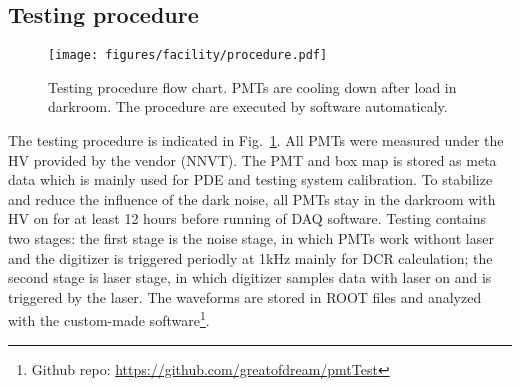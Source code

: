 \subsection{Testing procedure}
\begin{figure}
    \centering
    \texttt{[image: figures/facility/procedure.pdf]}
    \caption{Testing procedure flow chart. PMTs are cooling down after load in darkroom. The procedure are executed by software automaticaly.}
    \label{fig:testingprocedure}
\end{figure}

The testing procedure is indicated in Fig.~\ref{fig:testingprocedure}. All PMTs were measured under the HV provided by the vendor (NNVT). %
The PMT and box map is stored as meta data which is mainly used for PDE and testing system calibration. To stabilize and reduce the influence of the dark noise, all PMTs stay in the darkroom with HV on for at least 12 hours before running of DAQ software. Testing contains two stages: the first stage is the noise stage, in which PMTs work without laser and the digitizer is triggered periodly at 1kHz mainly for DCR calculation; the second stage is laser stage, in which digitizer samples data with laser on and is triggered by the laser. The waveforms are stored in ROOT files and analyzed with the custom-made software\footnote{Github repo: \url{https://github.com/greatofdream/pmtTest}}.